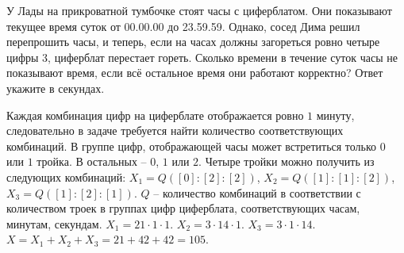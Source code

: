
У Лады на прикроватной тумбочке стоят часы с циферблатом. Они показывают текущее время суток от 00.00.00 до 23.59.59. Однако, сосед Дима решил перепрошить часы, и теперь, если на часах должны загореться ровно четыре цифры 3, циферблат перестает гореть. Сколько времени в течение суток часы не показывают время, если всё остальное время они работают корректно? Ответ укажите в секундах.

\soultionSection

Каждая комбинация цифр на циферблате отображается ровно $1$ минуту, следовательно в задаче требуется найти количество соответствующих комбинаций. В группе цифр, отображающей часы может встретиться только $0$ или $1$ тройка. В остальных -- $0$, $1$ или $2$. Четыре тройки можно получить из следующих комбинаций: $X_1 = Q([0]:[2]:[2])$, $X_2 = Q([1]:[1]:[2])$, $X_3 = Q([1]:[2]:[1])$. $Q$ -- количество комбинаций в соответствии с количеством троек в группах цифр циферблата, соответствующих часам, минутам, секундам. $X_1 = 21 \cdot 1 \cdot 1$. $X_2 = 3 \cdot 14 \cdot 1$. $X_3 = 3 \cdot 1 \cdot 14$. $X = X_1 + X_2 + X_3 = 21 + 42 + 42 = 105$.

